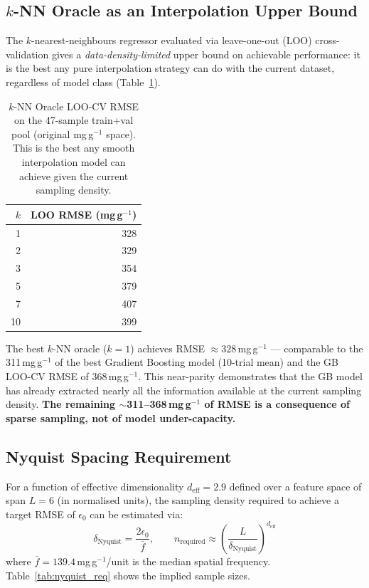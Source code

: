 \documentclass[12pt,a4paper]{article}
\begin{document}
\subsection{$k$-NN Oracle as an Interpolation Upper Bound}

The $k$-nearest-neighbours regressor \citep{Cover1967, Stone1977} evaluated via leave-one-out (LOO)
cross-validation \citep{Arlot2010} gives a \emph{data-density-limited} upper bound on
achievable performance: it is the best any pure interpolation strategy
can do with the current dataset, regardless of model class
(Table~\ref{tab:knn_oracle}).

\begin{table}[h]
\centering
\caption{$k$-NN Oracle LOO-CV RMSE on the 47-sample train+val pool
  (original mg\,g$^{-1}$ space).  This is the best any smooth
  interpolation model can achieve given the current sampling density.}
\label{tab:knn_oracle}
\begin{tabular}{rr}
\toprule
$k$ & LOO RMSE (mg\,g$^{-1}$) \\
\midrule
1  & 328 \\
2  & 329 \\
3  & 354 \\
5  & 379 \\
7  & 407 \\
10 & 399 \\
\bottomrule
\end{tabular}
\end{table}

The best $k$-NN oracle ($k=1$) achieves RMSE $\approx 328$\,mg\,g$^{-1}$ — comparable to
the 311\,mg\,g$^{-1}$ of the best Gradient Boosting model (10-trial mean)
and the GB LOO-CV RMSE of 368\,mg\,g$^{-1}$.  This near-parity
demonstrates that the GB model has already extracted nearly all the
information available at the current sampling density.
\textbf{The remaining $\sim$311--368\,mg\,g$^{-1}$ of RMSE is a
consequence of sparse sampling, not of model under-capacity.}

\subsection{Nyquist Spacing Requirement}

For a function of effective dimensionality $d_{\text{eff}} = 2.9$ defined
over a feature space of span $L = 6$ (in normalised units), the sampling
density required to achieve a target RMSE of $\epsilon_0$ can be estimated
via:
\begin{equation}
  \delta_{\text{Nyquist}} = \frac{2\epsilon_0}{\bar{f}}, \qquad
  n_{\text{required}} \approx \left(\frac{L}{\delta_{\text{Nyquist}}}\right)^{d_{\text{eff}}}
  \label{eq:nyquist_n}
\end{equation}
where $\bar{f} = 139.4$\,mg\,g$^{-1}$/unit is the median spatial
frequency.  Table~\ref{tab:nyquist_req} shows the implied sample sizes.
\end{document}
